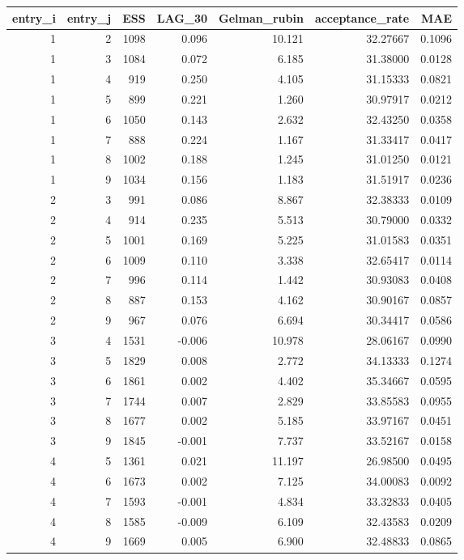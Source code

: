 \begin{longtable}{rrrrrrr}
\toprule
entry\_i & entry\_j & ESS & LAG\_30 & Gelman\_rubin & acceptance\_rate & MAE \\ 
\midrule
1 & 2 & 1098 & 0.096 & 10.121 & 32.27667 & 0.1096 \\ 
1 & 3 & 1084 & 0.072 & 6.185 & 31.38000 & 0.0128 \\ 
1 & 4 & 919 & 0.250 & 4.105 & 31.15333 & 0.0821 \\ 
1 & 5 & 899 & 0.221 & 1.260 & 30.97917 & 0.0212 \\ 
1 & 6 & 1050 & 0.143 & 2.632 & 32.43250 & 0.0358 \\ 
1 & 7 & 888 & 0.224 & 1.167 & 31.33417 & 0.0417 \\ 
1 & 8 & 1002 & 0.188 & 1.245 & 31.01250 & 0.0121 \\ 
1 & 9 & 1034 & 0.156 & 1.183 & 31.51917 & 0.0236 \\ 
2 & 3 & 991 & 0.086 & 8.867 & 32.38333 & 0.0109 \\ 
2 & 4 & 914 & 0.235 & 5.513 & 30.79000 & 0.0332 \\ 
2 & 5 & 1001 & 0.169 & 5.225 & 31.01583 & 0.0351 \\ 
2 & 6 & 1009 & 0.110 & 3.338 & 32.65417 & 0.0114 \\ 
2 & 7 & 996 & 0.114 & 1.442 & 30.93083 & 0.0408 \\ 
2 & 8 & 887 & 0.153 & 4.162 & 30.90167 & 0.0857 \\ 
2 & 9 & 967 & 0.076 & 6.694 & 30.34417 & 0.0586 \\ 
3 & 4 & 1531 & -0.006 & 10.978 & 28.06167 & 0.0990 \\ 
3 & 5 & 1829 & 0.008 & 2.772 & 34.13333 & 0.1274 \\ 
3 & 6 & 1861 & 0.002 & 4.402 & 35.34667 & 0.0595 \\ 
3 & 7 & 1744 & 0.007 & 2.829 & 33.85583 & 0.0955 \\ 
3 & 8 & 1677 & 0.002 & 5.185 & 33.97167 & 0.0451 \\ 
3 & 9 & 1845 & -0.001 & 7.737 & 33.52167 & 0.0158 \\ 
4 & 5 & 1361 & 0.021 & 11.197 & 26.98500 & 0.0495 \\ 
4 & 6 & 1673 & 0.002 & 7.125 & 34.00083 & 0.0092 \\ 
4 & 7 & 1593 & -0.001 & 4.834 & 33.32833 & 0.0405 \\ 
4 & 8 & 1585 & -0.009 & 6.109 & 32.43583 & 0.0209 \\ 
4 & 9 & 1669 & 0.005 & 6.900 & 32.48833 & 0.0865 \\ 

\end{longtable}
